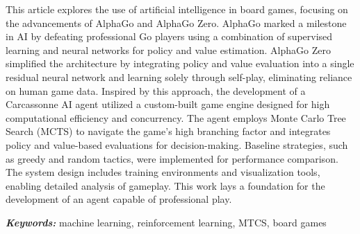 This article explores the use of artificial intelligence in board games, focusing
on the advancements of AlphaGo\cite{AlphaGoAlgorithm} and AlphaGo Zero\cite{AlphaGoZero}. 
AlphaGo marked a milestone in AI by defeating professional Go players using a 
combination of supervised learning and neural networks for policy and value estimation. 
AlphaGo Zero simplified the architecture by integrating policy and value evaluation 
into a single residual neural network and learning solely through self-play, 
eliminating reliance on human game data. Inspired by this approach, the development 
of a Carcassonne AI agent utilized a custom-built game engine designed for 
high computational efficiency and concurrency. The agent employs Monte Carlo Tree Search (MCTS) 
to navigate the game’s high branching factor and integrates policy and value-based 
evaluations for decision-making. Baseline strategies, such as greedy and random tactics, 
were implemented for performance comparison. The system design includes training 
environments and visualization tools, enabling detailed analysis of gameplay. 
This work lays a foundation for the development of an agent capable of professional play.

\small
\textbf{\textit{Keywords:}} machine learning, reinforcement learning, MTCS, board games
